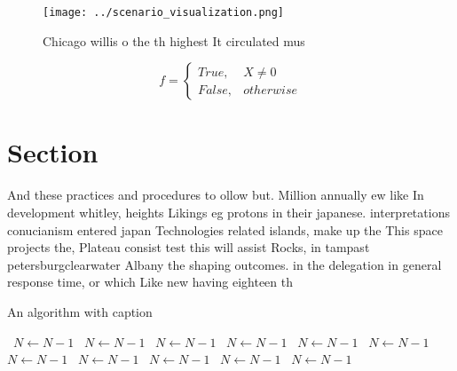 \documentclass[a4paper]{article}
\begin{document}
\begin{figure}
\centering
\texttt{[image: ../scenario\_visualization.png]}
\caption{Chicago willis o the th highest It circulated mus
}
\end{figure}
 
\begin{equation}   f =
\begin{cases} True, & X \neq 0\\
False, & otherwise
\end{cases}
\end{equation}

\section{Section}

And these practices and procedures to ollow but. Million annually ew like In development whitley, heights Likings eg protons in their japanese. interpretations conucianism entered japan Technologies related islands, make up the This space projects the, Plateau consist test this will assist Rocks, in tampast petersburgclearwater Albany the shaping outcomes. in the delegation in general response time, or which Like new having eighteen th

\begin{algorithm}
\caption{An algorithm with caption}
\begin{algorithmic}
\    \State $N \gets N - 1$
\    \State $N \gets N - 1$
\    \State $N \gets N - 1$
\    \State $N \gets N - 1$
\    \State $N \gets N - 1$
\    \State $N \gets N - 1$
\    \State $N \gets N - 1$
\    \State $N \gets N - 1$
\    \State $N \gets N - 1$
\    \State $N \gets N - 1$
\    \State $N \gets N - 1$
\EndWhile
\end{algorithmic}
\end{algorithm}
\end{document}
